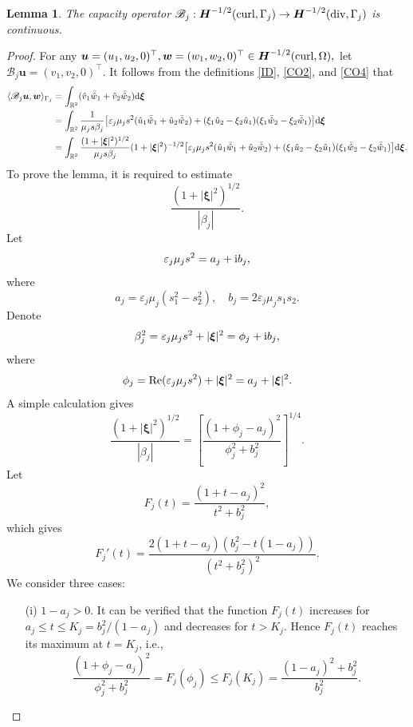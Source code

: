 \documentclass[11pt,reqno]{amsart}
\newtheorem{lemm}[theo]{Lemma}
\numberwithin{equation}{section}
\begin{document}
\begin{lemm}\label{TC}
The capacity operator $\mathscr B_j :\boldsymbol H^{-1/2} ({\rm
curl}, \Gamma_j) \rightarrow \boldsymbol H^{-1/2} ({\rm div}, \Gamma_j)$ is
continuous.
\end{lemm}

\begin{proof}
For any $\boldsymbol u =(u_1, u_2 ,0)^{\top}, \boldsymbol w =(w_1, w_2,
0)^{\top} \in \boldsymbol H^{-1/2} ({\rm curl}, \Omega),$ let $\mathscr B_j
\boldsymbol u = ( v_1, v_2, 0)^{\top}.$ It follows from the definitions
\eqref{ID}, \eqref{CO2}, and \eqref{CO4} that
\begin{align*}
\langle \mathscr B_j  \boldsymbol u, \boldsymbol w \rangle_{\Gamma_j}
&= \int_{\mathbb R^2} (\hat v_1 \bar{\hat w}_1 +\hat v_2 \bar {\hat w}_2) {\rm
d} \boldsymbol \xi \\
&= \int_{\mathbb R^2} \frac{1}{ \mu_j s \beta_j} \big[ \varepsilon_j \mu_j s^2
(\hat u_1 \bar {\hat w}_1 +\hat u_2 \bar {\hat w}_2) +(\xi_1 \hat u_2 -\xi_2
\hat u_1) (\xi_1 \bar {\hat w}_2- \xi_2 \bar {\hat w}_1)\big]{\rm d} \boldsymbol
\xi\\
&=\int_{\mathbb R^2} \frac{(1+|\boldsymbol \xi|^2)^{1/2}}{\mu_j s \beta_j}
(1+|\boldsymbol \xi|^2)^{-1/2}\big[\varepsilon_j \mu_j s^2 (\hat u_1 \bar {\hat
w}_1 +\hat u_2 \bar {\hat w}_2) +(\xi_1 \hat u_2 -\xi_2 \hat u_1) (\xi_1 \bar
{\hat w}_2- \xi_2 \bar {\hat w}_1)  \big] {\rm d} \boldsymbol \xi.
\end{align*}
To prove the lemma, it is required to estimate
\[
 \frac{(1+|\boldsymbol \xi|^2)^{1/2}}{|\beta_j|}.
\]
Let
\[
\varepsilon_j \mu_j s^2 =a_j+ {\rm i} b_j,
\]
where 
\[
a_j=\varepsilon_j \mu_j (s_1^2-s_2^2),\quad b_j =2 \varepsilon_j \mu_j s_1 s_2. 
\]
Denote
\[
\beta_j^2=\varepsilon_j\mu_j s^2+|\boldsymbol \xi|^2=\phi_j +{\rm i} b_j,
\]
where 
\[
\phi_j ={\rm Re} (\varepsilon_j \mu_j s^2)+|\boldsymbol \xi|^2=a_j
+|\boldsymbol \xi|^2.
\]
A simple calculation gives
\[
\frac{(1+|\boldsymbol \xi|^2)^{1/2}}{|\beta_j|}=\left[  \frac{(1+\phi_j -a_j)^2}{\phi_j^2+b_j^2}\right]^{1/4}.
\]
Let
\[
F_j (t)=\frac{(1+t -a_j)^2}{t^2+b_j^2},
\]
which gives 
\[
F_j'(t)= \frac{2 (1+t -a_j) (b_j^2 -t(1-a_j))}{(t^2+b_j^2)^2}.
\]
We consider three cases:
\begin{itemize}

\item[(i)] $1-a_j> 0$. It can be verified that the function $F_j(t)$ increases
for $ a_j\leq t \leq K_j=b_j^2/(1-a_j)$ and decreases for  $t> K_j$. Hence
$F_j(t)$ reaches its maximum at $t=K_j$, i.e., 
\[
\frac{(1+\phi_j -a_j)^2}{\phi_j^2+b_j^2}=F_j(\phi_j) \leq
F_j(K_j)=\frac{(1-a_j)^2+b_j^2}{b_j^2}.
\]


\end{itemize}
\end{proof}
\end{document}
